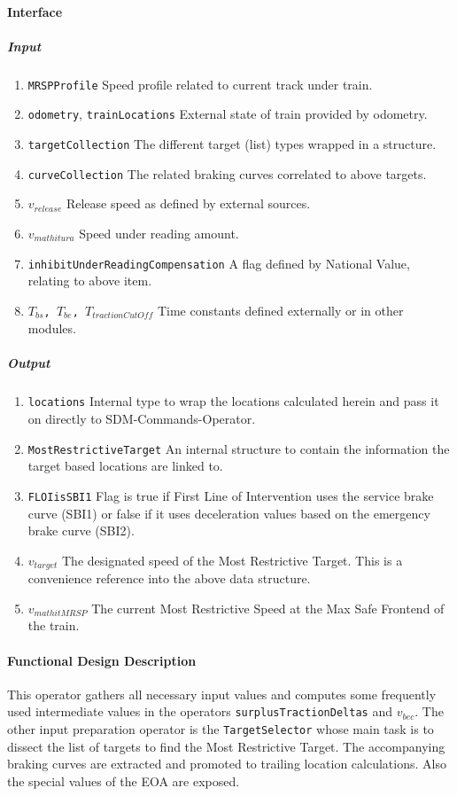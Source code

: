 \paragraph{Interface}
\subparagraph{Input}
\begin{enumerate}
  \item \texttt{MRSPProfile} Speed profile related to current track under train.
  \item \texttt{odometry}, \texttt{trainLocations} External state of train provided by odometry.
  \item \texttt{targetCollection} The different target (list) types wrapped in a structure.
  \item \texttt{curveCollection} The related braking curves correlated to above targets.
  \item \texttt{$v_{\mathit{release}}$} Release speed as defined by external sources.
  \item \texttt{$v_{mathit{ura}}$} Speed under reading amount.
  \item \texttt{inhibitUnderReadingCompensation} A flag defined by National Value, relating to above item.
  \item \texttt{$T_{bs}$, $T_{be}$, $T_{\mathit{tractionCutOff}}$} Time constants defined externally or in other modules.
\end{enumerate}
\subparagraph{Output}
\begin{enumerate}
  \item \texttt{locations} Internal type to wrap the locations calculated herein and pass it on directly to SDM-Commands-Operator.
  \item \texttt{MostRestrictiveTarget} An internal structure to contain the information the target based locations are linked to.
  \item \texttt{FLOIisSBI1} Flag is true if First Line of Intervention uses the service brake curve (SBI1) or false if it uses deceleration values based on the emergency brake curve (SBI2).
  \item \texttt{$v_{\mathit{target}}$} The designated speed of the Most Restrictive Target. This is a convenience reference into the above data structure. 
  \item \texttt{$v_{mathit{MRSP}}$} The current Most Restrictive Speed at the Max Safe Frontend of the train.
\end{enumerate}

\paragraph{Functional Design Description}
This operator gathers all necessary input values and computes some frequently used intermediate values in the operators \texttt{surplusTractionDeltas} and \texttt{$v_{\mathit{bec}}$}. The other input preparation operator is the \texttt{TargetSelector} whose main task is to dissect the list of targets to find the Most Restrictive Target. The accompanying braking curves are extracted and promoted to trailing location calculations. Also the special values of the EOA are exposed.

